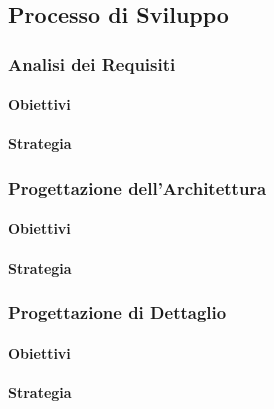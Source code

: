 \subsection{Processo di Sviluppo}
	\subsubsection{Analisi dei Requisiti}
		\paragraph{Obiettivi}
		\paragraph{Strategia}	
	\subsubsection{Progettazione dell'Architettura}
		\paragraph{Obiettivi}
		\paragraph{Strategia}	
	\subsubsection{Progettazione di Dettaglio}
		\paragraph{Obiettivi}
		\paragraph{Strategia}	